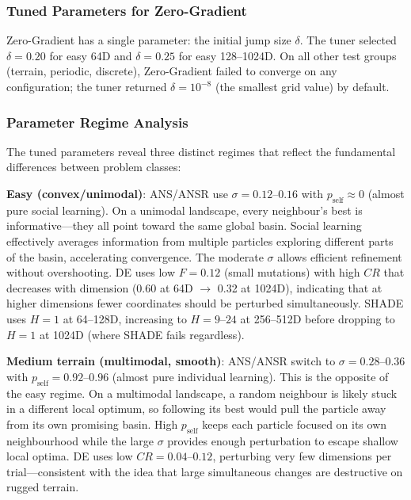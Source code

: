 \documentclass[11pt,a4paper]{article}
\begin{document}
\subsubsection{Tuned Parameters for Zero-Gradient}

Zero-Gradient has a single parameter: the initial jump size $\delta$. The tuner selected $\delta = 0.20$ for easy 64D and $\delta = 0.25$ for easy 128--1024D. On all other test groups (terrain, periodic, discrete), Zero-Gradient failed to converge on any configuration; the tuner returned $\delta = 10^{-8}$ (the smallest grid value) by default.

\subsubsection{Parameter Regime Analysis}

The tuned parameters reveal three distinct regimes that reflect the fundamental differences between problem classes:

\textbf{Easy (convex/unimodal)}: ANS/ANSR use $\sigma = 0.12$--$0.16$ with $p_{\text{self}} \approx 0$ (almost pure social learning). On a unimodal landscape, every neighbour's best is informative---they all point toward the same global basin. Social learning effectively averages information from multiple particles exploring different parts of the basin, accelerating convergence. The moderate $\sigma$ allows efficient refinement without overshooting. DE uses low $F = 0.12$ (small mutations) with high $CR$ that decreases with dimension (0.60 at 64D $\to$ 0.32 at 1024D), indicating that at higher dimensions fewer coordinates should be perturbed simultaneously. SHADE uses $H = 1$ at 64--128D, increasing to $H = 9$--$24$ at 256--512D before dropping to $H = 1$ at 1024D (where SHADE fails regardless).

\textbf{Medium terrain (multimodal, smooth)}: ANS/ANSR switch to $\sigma = 0.28$--$0.36$ with $p_{\text{self}} = 0.92$--$0.96$ (almost pure individual learning). This is the opposite of the easy regime. On a multimodal landscape, a random neighbour is likely stuck in a different local optimum, so following its best would pull the particle away from its own promising basin. High $p_{\text{self}}$ keeps each particle focused on its own neighbourhood while the large $\sigma$ provides enough perturbation to escape shallow local optima. DE uses low $CR = 0.04$--$0.12$, perturbing very few dimensions per trial---consistent with the idea that large simultaneous changes are destructive on rugged terrain.
\end{document}
